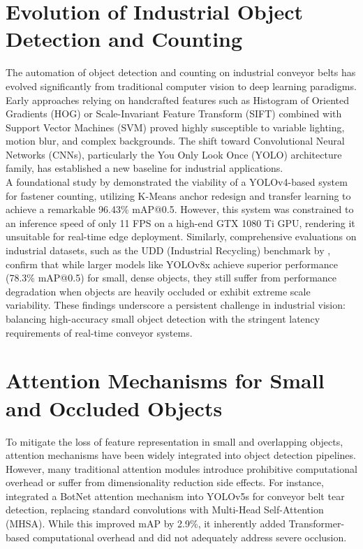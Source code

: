 \section{Evolution of Industrial Object Detection and Counting}
The automation of object detection and counting on industrial conveyor belts has evolved significantly from traditional computer vision to deep learning paradigms. Early approaches relying on handcrafted features such as Histogram of Oriented Gradients (HOG) or Scale-Invariant Feature Transform (SIFT) combined with Support Vector Machines (SVM) proved highly susceptible to variable lighting, motion blur, and complex backgrounds. The shift toward Convolutional Neural Networks (CNNs), particularly the You Only Look Once (YOLO) architecture family, has established a new baseline for industrial applications.\\

A foundational study by \cite{jiang2021accurate} demonstrated the viability of a YOLOv4-based system for fastener counting, utilizing K-Means anchor redesign and transfer learning to achieve a remarkable 96.43\% mAP@0.5. However, this system was constrained to an inference speed of only 11 FPS on a high-end GTX 1080 Ti GPU, rendering it unsuitable for real-time edge deployment. Similarly, comprehensive evaluations on industrial datasets, such as the UDD (Industrial Recycling) benchmark by \cite{Messai_2026}, confirm that while larger models like YOLOv8x achieve superior performance (78.3\% mAP@0.5) for small, dense objects, they still suffer from performance degradation when objects are heavily occluded or exhibit extreme scale variability. These findings underscore a persistent challenge in industrial vision: balancing high-accuracy small object detection with the stringent latency requirements of real-time conveyor systems.

\section{Attention Mechanisms for Small and Occluded Objects}
To mitigate the loss of feature representation in small and overlapping objects, attention mechanisms have been widely integrated into object detection pipelines. However, many traditional attention modules introduce prohibitive computational overhead or suffer from dimensionality reduction side effects. For instance, \cite{Liu2025YOLO} integrated a BotNet attention mechanism into YOLOv5s for conveyor belt tear detection, replacing standard convolutions with Multi-Head Self-Attention (MHSA). While this improved mAP by 2.9\%, it inherently added Transformer-based computational overhead and did not adequately address severe occlusion.\\


